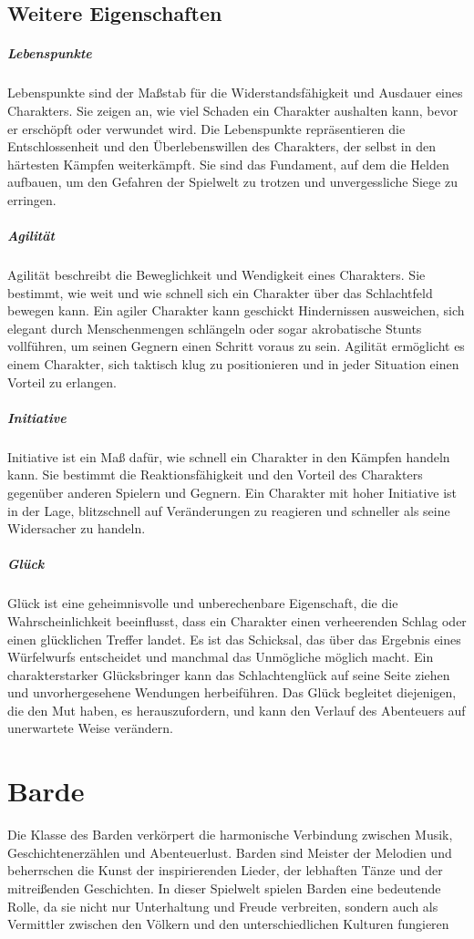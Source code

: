 \documentclass[letterpaper,twocolumn,openany,nodeprecatedcode]{dndbook}
\begin{document}
\subsection{Weitere Eigenschaften}

\subparagraph{Lebenspunkte} Lebenspunkte sind der Maßstab für die Widerstandsfähigkeit und Ausdauer eines Charakters. Sie zeigen an, wie viel Schaden ein Charakter aushalten kann, bevor er erschöpft oder verwundet wird. Die Lebenspunkte repräsentieren die Entschlossenheit und den Überlebenswillen des Charakters, der selbst in den härtesten Kämpfen weiterkämpft. Sie sind das Fundament, auf dem die Helden aufbauen, um den Gefahren der Spielwelt zu trotzen und unvergessliche Siege zu erringen.

\subparagraph{Agilität} Agilität beschreibt die Beweglichkeit und Wendigkeit eines Charakters. Sie bestimmt, wie weit und wie schnell sich ein Charakter über das Schlachtfeld bewegen kann. Ein agiler Charakter kann geschickt Hindernissen ausweichen, sich elegant durch Menschenmengen schlängeln oder sogar akrobatische Stunts vollführen, um seinen Gegnern einen Schritt voraus zu sein. Agilität ermöglicht es einem Charakter, sich taktisch klug zu positionieren und in jeder Situation einen Vorteil zu erlangen.

\subparagraph{Initiative} Initiative ist ein Maß dafür, wie schnell ein Charakter in den Kämpfen handeln kann. Sie bestimmt die Reaktionsfähigkeit und den Vorteil des Charakters gegenüber anderen Spielern und Gegnern. Ein Charakter mit hoher Initiative ist in der Lage, blitzschnell auf Veränderungen zu reagieren und schneller als seine Widersacher zu handeln. 

\subparagraph{Glück} Glück ist eine geheimnisvolle und unberechenbare Eigenschaft, die die Wahrscheinlichkeit beeinflusst, dass ein Charakter einen verheerenden Schlag oder einen glücklichen Treffer landet. Es ist das Schicksal, das über das Ergebnis eines Würfelwurfs entscheidet und manchmal das Unmögliche möglich macht. Ein charakterstarker Glücksbringer kann das Schlachtenglück auf seine Seite ziehen und unvorhergesehene Wendungen herbeiführen. Das Glück begleitet diejenigen, die den Mut haben, es herauszufordern, und kann den Verlauf des Abenteuers auf unerwartete Weise verändern.

\section{Barde}
Die Klasse des Barden verkörpert die harmonische Verbindung zwischen Musik, Geschichtenerzählen und Abenteuerlust. Barden sind Meister der Melodien und beherrschen die Kunst der inspirierenden Lieder, der lebhaften Tänze und der mitreißenden Geschichten. In dieser Spielwelt spielen Barden eine bedeutende Rolle, da sie nicht nur Unterhaltung und Freude verbreiten, sondern auch als Vermittler zwischen den Völkern und den unterschiedlichen Kulturen fungieren
\end{document}
